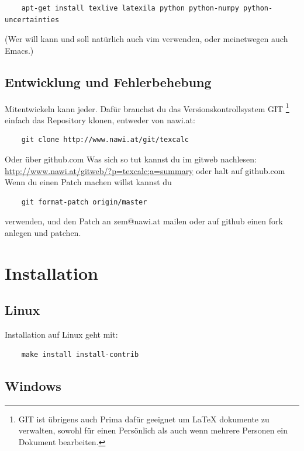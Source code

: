 \documentclass[a4paper]{article}
\begin{document}
\begin{verbatim}
	apt-get install texlive latexila python python-numpy python-uncertainties
\end{verbatim}

(Wer will kann und soll natürlich auch vim verwenden, oder meinetwegen auch Emacs.)

\subsection{Entwicklung und Fehlerbehebung}

Mitentwickeln kann jeder. Dafür brauchst du das Versionskontrollsystem GIT
\footnote{GIT ist übrigens auch Prima dafür geeignet um LaTeX dokumente zu verwalten,
sowohl für einen Persönlich als auch wenn mehrere Personen ein Dokument bearbeiten. }
einfach das Repository klonen, entweder von nawi.at:

\begin{verbatim}
	git clone http://www.nawi.at/git/texcalc
\end{verbatim}

Oder über github.com Was sich so tut kannst du im gitweb nachlesen:
\url{http://www.nawi.at/gitweb/?p=texcalc;a=summary} oder halt auf github.com\\

Wenn du einen Patch machen willst kannst du

\begin{verbatim}
	git format-patch origin/master
\end{verbatim}

verwenden, und den Patch an zem@nawi.at mailen oder auf github einen fork
anlegen und patchen.


\section{Installation}

\subsection{Linux}

Installation auf Linux geht mit:

\begin{verbatim}
	make install install-contrib
\end{verbatim}

\subsection{Windows}
\end{document}
